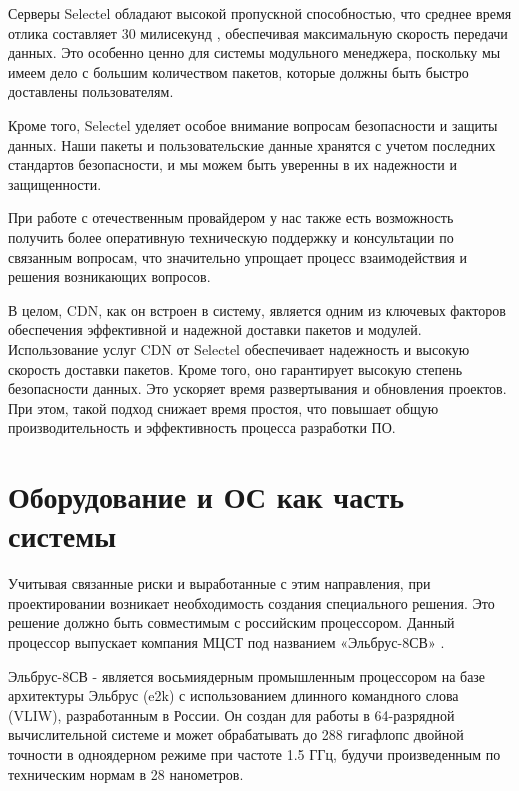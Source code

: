 Серверы Selectel обладают высокой пропускной способностью, что среднее время отлика составляет 30 милисекунд \cite{cdn:selectel}, обеспечивая максимальную скорость передачи данных. Это особенно ценно для системы модульного менеджера, поскольку мы имеем дело с большим количеством пакетов, которые должны быть быстро доставлены пользователям.

Кроме того, Selectel уделяет особое внимание вопросам безопасности и защиты данных. Наши пакеты и пользовательские данные хранятся с учетом последних стандартов безопасности, и мы можем быть уверенны в их надежности и защищенности.

При работе с отечественным провайдером у нас также есть возможность получить более оперативную техническую поддержку и консультации по связанным вопросам, что значительно упрощает процесс взаимодействия и решения возникающих вопросов.

В целом, CDN, как он встроен в систему, является одним из ключевых факторов обеспечения эффективной и надежной доставки пакетов и модулей. Использование услуг CDN от Selectel обеспечивает надежность и высокую скорость доставки пакетов. Кроме того, оно гарантирует высокую степень безопасности данных. Это ускоряет время развертывания и обновления проектов. При этом, такой подход снижает время простоя, что повышает общую производительность и эффективность процесса разработки ПО.

\section{Оборудование и ОС как часть системы}

Учитывая связанные риски и выработанные с этим направления, при проектировании возникает необходимость создания специального решения. Это решение должно быть совместимым с российским процессором. Данный процессор выпускает компания МЦСТ под названием «Эльбрус-8СВ» \cite{dev:elbrus_cpu}. 

Эльбрус-8СВ - является восьмиядерным промышленным процессором на базе архитектуры Эльбрус (e2k) с использованием длинного командного слова (VLIW), разработанным в России. Он создан для работы в 64-разрядной вычислительной системе и может обрабатывать до 288 гигафлопс двойной точности в одноядерном режиме при частоте 1.5 ГГц, будучи произведенным по техническим нормам в 28 нанометров. 


